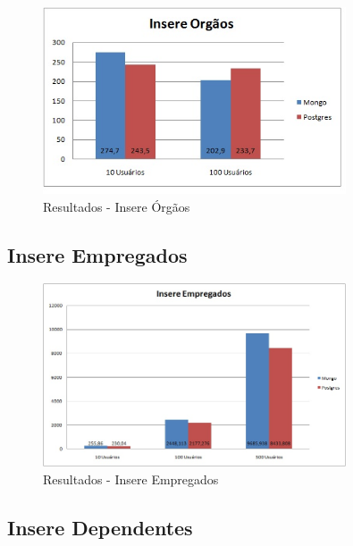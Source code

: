 \begin{figure}[!htbp]
	\begin{center}
		\includegraphics[width=0.8\textwidth]{resultados/insere_orgaos}
	\end{center}
	\caption{Resultados - Insere Órgãos}
	\label{fig:resultinsereorgaos}
\end{figure}

\subsection{Insere Empregados}

\begin{figure}[!htbp]
	\begin{center}
		\includegraphics[width=0.8\textwidth]{resultados/insere_empregados}
	\end{center}
	\caption{Resultados - Insere Empregados}
	\label{fig:resultinsereempregados}
\end{figure}

\subsection{Insere Dependentes}

